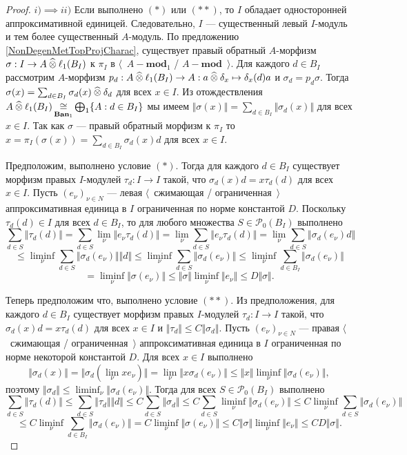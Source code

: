 \begin{proof} $i)$$\implies$$ii)$ Если выполнено $(*)$ или $(**)$, то $I$ обладает односторонней аппроксимативной единицей. Следовательно, $I$ --- существенный левый $I$-модуль и тем более существенный $A$-модуль. По предложению \ref{NonDegenMetTopProjCharac}, существует правый обратный $A$-морфизм $\sigma:I\to A\mathbin{\widehat{\otimes}} \ell_1(B_I)$ к $\pi_I$ в $\langle$~$A-\mathbf{mod}_1$ / $A-\mathbf{mod}$~$\rangle$. Для каждого $d\in B_I$ рассмотрим $A$-морфизм $p_d:A\mathbin{\widehat{\otimes}} \ell_1(B_I)\to A:a\mathbin{\widehat{\otimes}} \delta_x\mapsto \delta_x(d)a$ и $\sigma_d=p_d\sigma$. Тогда $\sigma(x)=\sum_{d\in B_I}\sigma_d(x)\mathbin{\widehat{\otimes}} \delta_d$ для всех $x\in I$. Из отождествления $A\mathbin{\widehat{\otimes}}\ell_1(B_I)\mathop{\mathbin{\cong}}\limits_{\mathbf{Ban}_1}\bigoplus_1\{A:d\in B_I\}$ мы имеем $\Vert\sigma(x)\Vert=\sum_{d\in B_I} \Vert\sigma_d(x)\Vert$ для всех $x\in I$. Так как $\sigma$ --- правый обратный морфизм к $\pi_I$ то $x=\pi_I(\sigma(x))=\sum_{d\in B_I}\sigma_d(x)d$ для всех $x\in I$. 

Предположим, выполнено условие $(*)$. Тогда для каждого $d\in B_I$ существует морфизм правых $I$-модулей $\tau_d:I\to I$ такой, что $\sigma_d(x)d=x\tau_d(d)$ для всех $x\in I$.  Пусть $(e_\nu)_{\nu\in N}$ --- левая $\langle$~сжимающая / ограниченная~$\rangle$ аппроксимативная единица в $I$ ограниченная по норме константой $D$. Поскольку $\tau_d(d)\in I$ для всех $d\in B_I$, то для любого множества $S\in\mathcal{P}_0(B_I)$ выполнено
$$
\sum_{d\in S}\Vert \tau_d(d)\Vert
=\sum_{d\in S}\lim_{\nu}\Vert e_\nu \tau_d(d) \Vert
=\lim_{\nu}\sum_{d\in S}\Vert e_\nu \tau_d(d)\Vert
=\lim_{\nu}\sum_{d\in S}\Vert \sigma_d(e_\nu)d \Vert
$$
$$
\leq\liminf_{\nu}\sum_{d\in S}\Vert\sigma_d(e_\nu)\Vert\Vert d\Vert 
\leq\liminf_{\nu}\sum_{d\in S}\Vert\sigma_d(e_\nu)\Vert
\leq\liminf_{\nu}\sum_{d\in B_I}\Vert\sigma_d(e_\nu)\Vert
$$
$$
=\liminf_{\nu}\Vert\sigma(e_\nu)\Vert
\leq\Vert\sigma\Vert\liminf_{\nu}\Vert e_\nu\Vert
\leq D\Vert\sigma\Vert.
$$

Теперь предположим что, выполнено условие $(**)$. Из предположения, для каждого $d\in B_I$ существует морфизм правых $I$-модулей $\tau_d:I\to I$ такой, что $\sigma_d(x)d=x\tau_d(d)$ для всех $x\in I$ и $\Vert\tau_d\Vert\leq C\Vert\sigma_d\Vert$. Пусть $(e_\nu)_{\nu\in N}$ --- правая $\langle$~сжимающая / ограниченная~$\rangle$ аппроксимативная единица в $I$ ограниченная по норме некоторой константой $D$. Для всех $x\in I$ выполнено
$$
\Vert\sigma_d(x)\Vert
=\Vert\sigma_d(\lim_\nu x e_\nu)\Vert
=\lim_\nu\Vert x\sigma_d(e_\nu)\Vert
\leq\Vert x\Vert\liminf_\nu\Vert\sigma_d(e_\nu)\Vert,
$$
поэтому $\Vert\sigma_d\Vert\leq \liminf_\nu\Vert\sigma_d(e_\nu)\Vert$. Тогда для всех $S\in\mathcal{P}_0(B_I)$ выполнено
$$
\sum_{d\in S}\Vert \tau_d(d)\Vert
\leq \sum_{d\in S}\Vert \tau_d\Vert\Vert d\Vert
\leq C\sum_{d\in S}\Vert \sigma_d\Vert
\leq C\sum_{d\in S}\liminf_\nu \Vert \sigma_d(e_\nu)\Vert
\leq C\liminf_{\nu}\sum_{d\in S}\Vert \sigma_d(e_\nu) \Vert
$$
$$
\leq C\liminf_{\nu}\sum_{d\in B_I}\Vert \sigma_d(e_\nu) \Vert
=C\liminf_{\nu}\Vert\sigma(e_\nu)\Vert
\leq C\Vert\sigma\Vert\liminf_{\nu}\Vert e_\nu\Vert
\leq CD\Vert\sigma\Vert.
$$


\end{proof}

